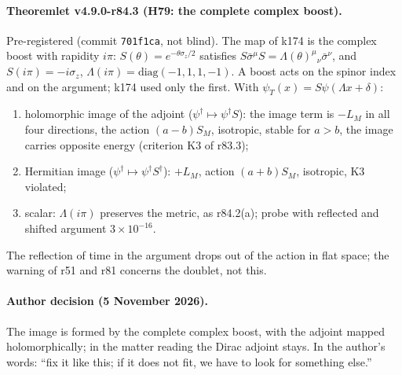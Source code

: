 \paragraph{Theoremlet v4.9.0-r84.3 (H79: the complete complex boost).}
Pre-registered (commit \texttt{701f1ca}, not blind).  The map of k174 is the complex boost with rapidity \(i\pi\): \(S(\theta)=e^{-\theta\sigma_z/2}\)
satisfies \(S\bar\sigma^\mu S=\Lambda(\theta)^\mu{}_\nu\bar\sigma^\nu\), and \(S(i\pi)=-i\sigma_z\), \(\Lambda(i\pi)=\mathrm{diag}(-1,1,1,-1)\).  A
boost acts on the spinor index and on the argument; k174 used only the first.  With \(\psi_T(x)=S\psi(\Lambda x+\delta)\):
\begin{enumerate}[leftmargin=2em]
\item[(a)] holomorphic image of the adjoint (\(\psi^\dagger\mapsto\psi^\dagger S\)): the image term is \(-L_M\) in all four directions, the action
\((a-b)S_M\), isotropic, stable for \(a>b\), the image carries opposite energy (criterion K3 of r83.3);
\item[(b)] Hermitian image (\(\psi^\dagger\mapsto\psi^\dagger S^\dagger\)): \(+L_M\), action \((a+b)S_M\), isotropic, K3 violated;
\item[(c)] scalar: \(\Lambda(i\pi)\) preserves the metric, as r84.2(a); probe with reflected and shifted argument \(3\times10^{-16}\).
\end{enumerate}
The reflection of time in the argument drops out of the action in flat space; the warning of r51 and r81 concerns the doublet, not this.

\paragraph{Author decision (5 November 2026).}
The image is formed by the complete complex boost, with the adjoint mapped holomorphically; in the matter reading the Dirac adjoint
stays.  In the author's words: ``fix it like this; if it does not fit, we have to look for something else.''

